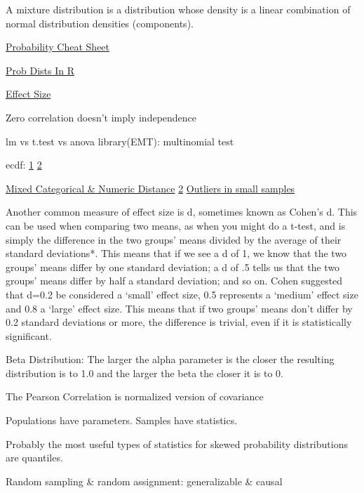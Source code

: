 \documentclass[]{book}
\begin{document}
A mixture distribution is a distribution whose density is a linear combination of normal distribution densities (components).

\href{http://www.wzchen.com/probability-cheatsheet}{Probability Cheat Sheet}

\href{http://www.cyclismo.org/tutorial/R/probability.html}{Prob Dists In R}

\href{https://www.leeds.ac.uk/educol/documents/00002182.htm}{Effect Size}

Zero correlation doesn't imply independence

lm vs t.test vs anova library(EMT): multinomial test

ecdf: \href{http://www.ericmjl.com/blog/2018/7/14/ecdfs/}{1} \href{https://www.rdocumentation.org/packages/stats/versions/3.4.3/topics/ecdf}{2}

\href{https://www.rdocumentation.org/packages/StatMatch/versions/1.2.5/topics/gower.dist}{Mixed Categorical \& Numeric Distance} \href{https://www.rdocumentation.org/packages/ltm/versions/1.1-1/topics/biserial.cor}{2} \href{https://stats.stackexchange.com/questions/78609/outlier-detection-in-very-small-sets/78617\#78617}{Outliers in small samples}

Another common measure of effect size is d, sometimes known as Cohen's d. This can be used when comparing two means, as when you might do a t-test, and is simply the difference in the two groups' means divided by the average of their standard deviations*. This means that if we see a d of 1, we know that the two groups' means differ by one standard deviation; a d of .5 tells us that the two groups' means differ by half a standard deviation; and so on. Cohen suggested that d=0.2 be considered a `small' effect size, 0.5 represents a `medium' effect size and 0.8 a `large' effect size. This means that if two groups' means don't differ by 0.2 standard deviations or more, the difference is trivial, even if it is statistically significant.

Beta Distribution: The larger the alpha parameter is the closer the resulting distribution is to 1.0 and the larger the beta the closer it is to 0.

The Pearson Correlation is normalized version of covariance

Populations have parameters. Samples have statistics.

Probably the most useful types of statistics for skewed probability distributions are quantiles.

Random sampling \& random assignment: generalizable \& causal
\end{document}
